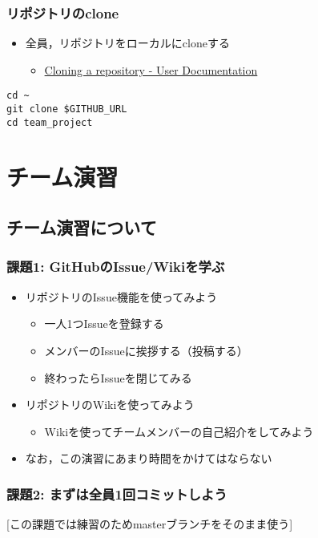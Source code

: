\documentclass[a4paper,twoside,twocolumn]{bxjsarticle}
\begin{document}
\subsubsection{リポジトリのclone}
\label{sec-1-1-4}
\begin{itemize}
\item 全員，リポジトリをローカルにcloneする
\begin{itemize}
\item \href{https://help.github.com/articles/cloning-a-repository/}{Cloning a repository - User Documentation}
\end{itemize}
\end{itemize}

\begin{verbatim}
cd ~
git clone $GITHUB_URL
cd team_project
\end{verbatim}

\section{チーム演習}
\label{sec-2}
\subsection{チーム演習について}
\label{sec-2-1}
\subsubsection{課題1: GitHubのIssue/Wikiを学ぶ}
\label{sec-2-1-1}
\begin{itemize}
\item リポジトリのIssue機能を使ってみよう
\begin{itemize}
\item 一人1つIssueを登録する
\item メンバーのIssueに挨拶する（投稿する）
\item 終わったらIssueを閉じてみる
\end{itemize}
\item リポジトリのWikiを使ってみよう
\begin{itemize}
\item Wikiを使ってチームメンバーの自己紹介をしてみよう
\end{itemize}
\item なお，この演習にあまり時間をかけてはならない
\end{itemize}

\subsubsection{課題2: まずは全員1回コミットしよう}
\label{sec-2-1-2}
[この課題では練習のためmasterブランチをそのまま使う]
\end{document}
